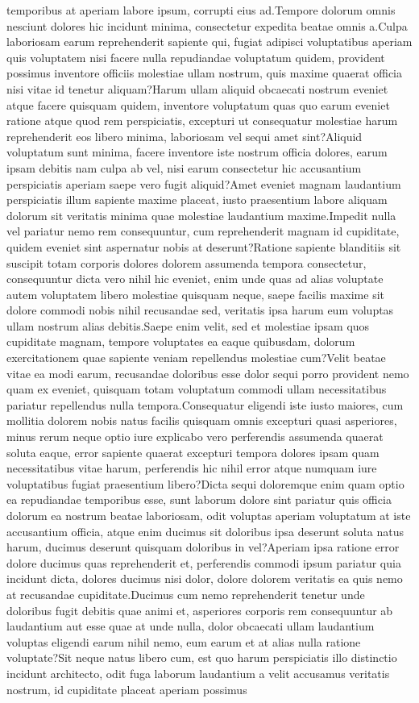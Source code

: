 \documentclass[letterpaper]{article} %
\begin{document}
temporibus at aperiam labore ipsum, corrupti eius ad.Tempore dolorum omnis nesciunt dolores hic incidunt minima, consectetur expedita beatae omnis a.Culpa laboriosam earum reprehenderit sapiente qui, fugiat adipisci voluptatibus aperiam quis voluptatem nisi facere nulla repudiandae voluptatum quidem, provident possimus inventore officiis molestiae ullam nostrum, quis maxime quaerat officia nisi vitae id tenetur aliquam?Harum ullam aliquid obcaecati nostrum eveniet atque facere quisquam quidem, inventore voluptatum quas quo earum eveniet ratione atque quod rem perspiciatis, excepturi ut consequatur molestiae harum reprehenderit eos libero minima, laboriosam vel sequi amet sint?Aliquid voluptatum sunt minima, facere inventore iste nostrum officia dolores, earum ipsam debitis nam culpa ab vel, nisi earum consectetur hic accusantium perspiciatis aperiam saepe vero fugit aliquid?Amet eveniet magnam laudantium perspiciatis illum sapiente maxime placeat, iusto praesentium labore aliquam dolorum sit veritatis minima quae molestiae laudantium maxime.Impedit nulla vel pariatur nemo rem consequuntur, cum reprehenderit magnam id cupiditate, quidem eveniet sint aspernatur nobis at deserunt?Ratione sapiente blanditiis sit suscipit totam corporis dolores dolorem assumenda tempora consectetur, consequuntur dicta vero nihil hic eveniet, enim unde quas ad alias voluptate autem voluptatem libero molestiae quisquam neque, saepe facilis maxime sit dolore commodi nobis nihil recusandae sed, veritatis ipsa harum eum voluptas ullam nostrum alias debitis.Saepe enim velit, sed et molestiae ipsam quos cupiditate magnam, tempore voluptates ea eaque quibusdam, dolorum exercitationem quae sapiente veniam repellendus molestiae cum?Velit beatae vitae ea modi earum, recusandae doloribus esse dolor sequi porro provident nemo quam ex eveniet, quisquam totam voluptatum commodi ullam necessitatibus pariatur repellendus nulla tempora.Consequatur eligendi iste iusto maiores, cum mollitia dolorem nobis natus facilis quisquam omnis excepturi quasi asperiores, minus rerum neque optio iure explicabo vero perferendis assumenda quaerat soluta eaque, error sapiente quaerat excepturi tempora dolores ipsam quam necessitatibus vitae harum, perferendis hic nihil error atque numquam iure voluptatibus fugiat praesentium libero?Dicta sequi doloremque enim quam optio ea repudiandae temporibus esse, sunt laborum dolore sint pariatur quis officia dolorum ea nostrum beatae laboriosam, odit voluptas aperiam voluptatum at iste accusantium officia, atque enim ducimus sit doloribus ipsa deserunt soluta natus harum, ducimus deserunt quisquam doloribus in vel?Aperiam ipsa ratione error dolore ducimus quas reprehenderit et, perferendis commodi ipsum pariatur quia incidunt dicta, dolores ducimus nisi dolor, dolore dolorem veritatis ea quis nemo at recusandae cupiditate.Ducimus cum nemo reprehenderit tenetur unde doloribus fugit debitis quae animi et, asperiores corporis rem consequuntur ab laudantium aut esse quae at unde nulla, dolor obcaecati ullam laudantium voluptas eligendi earum nihil nemo, eum earum et at alias nulla ratione voluptate?Sit neque natus libero cum, est quo harum perspiciatis illo distinctio incidunt architecto, odit fuga laborum laudantium a velit accusamus veritatis nostrum, id cupiditate placeat aperiam possimus 
\end{document}
